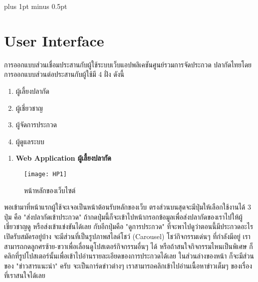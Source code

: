 
\clearpage
\thispagestyle{plain}

\begingroup
\fontsize{16pt}{19.2pt}\selectfont
\justifying
\XeTeXlinebreakskip=0pt plus 1pt minus 0.5pt
\setlength{\parindent}{1.5cm}
\setlength{\parskip}{0pt}


\section*{User Interface}

\indent การออกแบบส่วนเชื่อมประสานกับผู้ใช้ระบบเว็บแอปพลิเคชันศูนย์รวมการจัดประกวด
ปลากัดไทยโดยการออกแบบส่วนต่อประสานกับผู้ใช้มี 4 ฝั่ง ดังนี้

\begin{sloppypar}
	\begin{enumerate}
		\item ผู้เลี้ยงปลากัด
		\item ผู้เชี่ยวชาญ
		\item ผู้จัดการประกวด
		\item ผู้ดูแลระบบ
	\end{enumerate}
\end{sloppypar}

\begin{sloppypar}
	\begin{enumerate}
		\item \textbf{Web Application ผู้เลี้ยงปลากัด}
	\end{enumerate}
\end{sloppypar}

\begin{figure}[h]
	\centering
	\texttt{[image: HP1]}
	\caption{หน้าหลักของเว็บไซต์}
\end{figure}

\indent พอเข้ามาที่หน้าแรกผู้ใช้จะเจอเป็นหน้าต้อนรับหลักของเว็บ ตรงส่วนบนสุดจะมีปุ่มให้เลือกใช้งานได้ 3 ปุ่ม
คือ "ส่งปลากัดเข้าประกวด" ถ้ากดปุ่มนี้ก็จะเข้าไปหน้ากรอกข้อมูลเพื่อส่งปลากัดของเราไปให้ผู้เชี่ยวชาญดู หรือส่งเข้าแข่งขันได้เลย กับอีกปุ่มคือ "ดูการประกวด" ที่จะพาไปดูว่าตอนนี้มีประกวดอะไรเปิดรับสมัครอยู่บ้าง จะมีส่วนที่เป็นรูปภาพสไลด์โชว์ (Carousel) โชว์กิจกรรมเด่นๆ ที่กำลังมีอยู่ เราสามารถกดลูกศรซ้าย-ขวาเพื่อเลื่อนดูโปสเตอร์กิจกรรมอื่นๆ ได้ หรือถ้าสนใจกิจกรรมไหนเป็นพิเศษ ก็คลิกที่รูปโปสเตอร์นั้นเพื่อเข้าไปอ่านรายละเอียดของการประกวดได้เลย ในส่วนล่างของหน้า ก็จะมีส่วนของ "ข่าวสารแนะนำ" ครับ จะเป็นการ์ดข่าวต่างๆ เราสามารถคลิกเข้าไปอ่านเนื้อหาข่าวเต็มๆ ของเรื่องที่เราสนใจได้เลย

